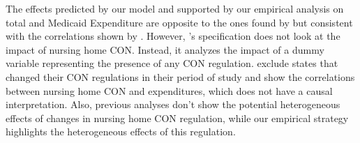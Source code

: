 \documentclass[../Main.tex]{subfiles}
\begin{document}
\indent The effects predicted by our model and supported by our empirical analysis on total and Medicaid Expenditure are opposite to the ones found by \citet{bailey2019can} but consistent with the correlations shown by \citet{rahman2016impact}. However, \citet{bailey2019can}’s specification does not look at the impact of nursing home CON. Instead, it analyzes the impact of a dummy variable representing the presence of any CON regulation. \citet{rahman2016impact} exclude states that changed their CON regulations in their period of study and show the correlations between nursing home CON and expenditures, which does not have a causal interpretation. Also, previous analyses don’t show the potential heterogeneous effects of changes in nursing home CON regulation, while our empirical strategy highlights the heterogeneous effects of this regulation. 
\end{document}
